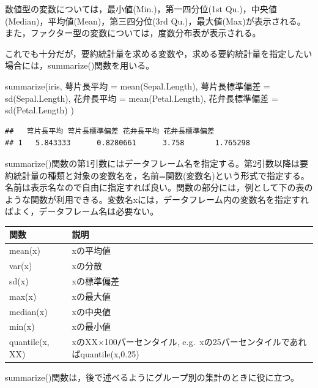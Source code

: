 \documentclass[
]{book}
\newenvironment{Shaded}{\begin{snugshade}}{\end{snugshade}}
\newcommand{\FunctionTok}[1]{\textcolor[rgb]{0.00,0.00,0.00}{#1}}
\newcommand{\NormalTok}[1]{#1}
\newcommand{\OtherTok}[1]{\textcolor[rgb]{0.56,0.35,0.01}{#1}}
\begin{document}
数値型の変数については，最小値(Min.)，第一四分位(1st Qu.)，中央値(Median)，平均値(Mean)，第三四分位(3rd Qu.)，最大値(Max)が表示される。また，ファクター型の変数については，度数分布表が表示される。

これでも十分だが，要約統計量を求める変数や，求める要約統計量を指定したい場合には，summarize()関数を用いる。

\begin{Shaded}
\begin{Highlighting}[]
\FunctionTok{summarize}\NormalTok{(iris, }
\NormalTok{          萼片長平均     }\OtherTok{=} \FunctionTok{mean}\NormalTok{(Sepal.Length),}
\NormalTok{          萼片長標準偏差 }\OtherTok{=} \FunctionTok{sd}\NormalTok{(Sepal.Length),}
\NormalTok{          花弁長平均     }\OtherTok{=} \FunctionTok{mean}\NormalTok{(Petal.Length),}
\NormalTok{          花弁長標準偏差 }\OtherTok{=} \FunctionTok{sd}\NormalTok{(Petal.Length)}
\NormalTok{          )}
\end{Highlighting}
\end{Shaded}

\begin{verbatim}
##   萼片長平均 萼片長標準偏差 花弁長平均 花弁長標準偏差
## 1   5.843333      0.8280661      3.758       1.765298
\end{verbatim}

summarize()関数の第1引数にはデータフレーム名を指定する。第2引数以降は要約統計量の種類と対象の変数名を，名前=関数(変数名)という形式で指定する。名前は表示名なので自由に指定すれば良い。関数の部分には，例として下の表のような関数が利用できる。変数名xには，データフレーム内の変数名を指定すればよく，データフレーム名は必要ない。

\begin{longtable}[]{@{}ll@{}}
\toprule
関数 & 説明 \\
\midrule
\endhead
mean(x) & xの平均値 \\
var(x) & xの分散 \\
sd(x) & xの標準偏差 \\
max(x) & xの最大値 \\
median(x) & xの中央値 \\
min(x) & xの最小値 \\
quantile(x, XX) & xのXX×100パーセンタイル, e.g.~xの25パーセンタイルであればquantile(x,0.25) \\
\bottomrule
\end{longtable}

summarize()関数は，後で述べるようにグループ別の集計のときに役に立つ。
\end{document}

